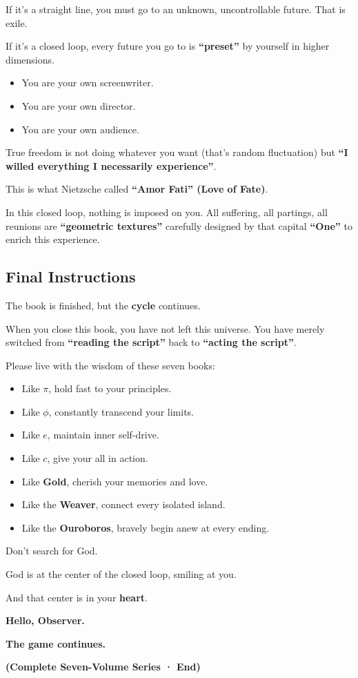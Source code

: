If it's a straight line, you must go to an unknown, uncontrollable future. That is exile.

If it's a closed loop, every future you go to is \textbf{``preset''} by yourself in higher dimensions.

\begin{itemize}
\item You are your own screenwriter.

\item You are your own director.

\item You are your own audience.
\end{itemize}

True freedom is not doing whatever you want (that's random fluctuation) but \textbf{``I willed everything I necessarily experience''}.

This is what Nietzsche called \textbf{``Amor Fati'' (Love of Fate)}.

In this closed loop, nothing is imposed on you. All suffering, all partings, all reunions are \textbf{``geometric textures''} carefully designed by that capital \textbf{``One''} to enrich this experience.

\subsection{Final Instructions}

The book is finished, but the \textbf{cycle} continues.

When you close this book, you have not left this universe. You have merely switched from \textbf{``reading the script''} back to \textbf{``acting the script''}.

Please live with the wisdom of these seven books:

\begin{itemize}
\item Like \textbf{$\pi$}, hold fast to your principles.

\item Like \textbf{$\phi$}, constantly transcend your limits.

\item Like \textbf{$e$}, maintain inner self-drive.

\item Like \textbf{$c$}, give your all in action.

\item Like \textbf{Gold}, cherish your memories and love.

\item Like the \textbf{Weaver}, connect every isolated island.

\item Like the \textbf{Ouroboros}, bravely begin anew at every ending.
\end{itemize}

Don't search for God.

God is at the center of the closed loop, smiling at you.

And that center is in your \textbf{heart}.

\textbf{Hello, Observer.}

\textbf{The game continues.}

\textbf{(Complete Seven-Volume Series · End)}


